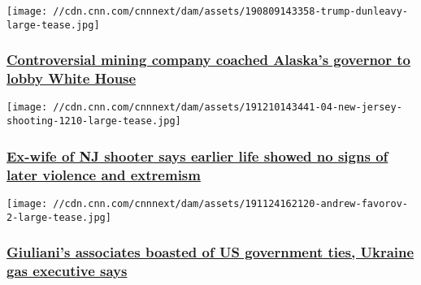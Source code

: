 \href{/2019/12/19/politics/pebble-mine-alaska-governor-controversy-invs/index.html}{}

\texttt{[image: //cdn.cnn.com/cnnnext/dam/assets/190809143358-trump-dunleavy-large-tease.jpg]}

\hypertarget{controversial-mining-company-coached-alaskas-governor-to-lobby-white-house-}{%
\subsubsection{\texorpdfstring{\href{/2019/12/19/politics/pebble-mine-alaska-governor-controversy-invs/index.html}{Controversial
mining company coached Alaska's governor to lobby White House
}}{Controversial mining company coached Alaska's governor to lobby White House }}\label{controversial-mining-company-coached-alaskas-governor-to-lobby-white-house-}}

\href{/2019/12/12/us/ex-wife-nj-shooter-david-anderson-invs/index.html}{}

\texttt{[image: //cdn.cnn.com/cnnnext/dam/assets/191210143441-04-new-jersey-shooting-1210-large-tease.jpg]}

\hypertarget{ex-wife-of-nj-shooter-says-earlier-life-showed-no-signs-of-later-violence-and-extremism}{%
\subsubsection{\texorpdfstring{\href{/2019/12/12/us/ex-wife-nj-shooter-david-anderson-invs/index.html}{Ex-wife
of NJ shooter says earlier life showed no signs of later violence and
extremism}}{Ex-wife of NJ shooter says earlier life showed no signs of later violence and extremism}}\label{ex-wife-of-nj-shooter-says-earlier-life-showed-no-signs-of-later-violence-and-extremism}}

\href{/2019/11/24/politics/favorov-giuliani-associates-naftogaz/index.html}{}

\texttt{[image: //cdn.cnn.com/cnnnext/dam/assets/191124162120-andrew-favorov-2-large-tease.jpg]}

\hypertarget{giulianis-associates-boasted-of-us-government-ties-ukraine-gas-executive-says}{%
\subsubsection{\texorpdfstring{\href{/2019/11/24/politics/favorov-giuliani-associates-naftogaz/index.html}{Giuliani's
associates boasted of US government ties, Ukraine gas executive
says}}{Giuliani's associates boasted of US government ties, Ukraine gas executive says}}\label{giulianis-associates-boasted-of-us-government-ties-ukraine-gas-executive-says}}

